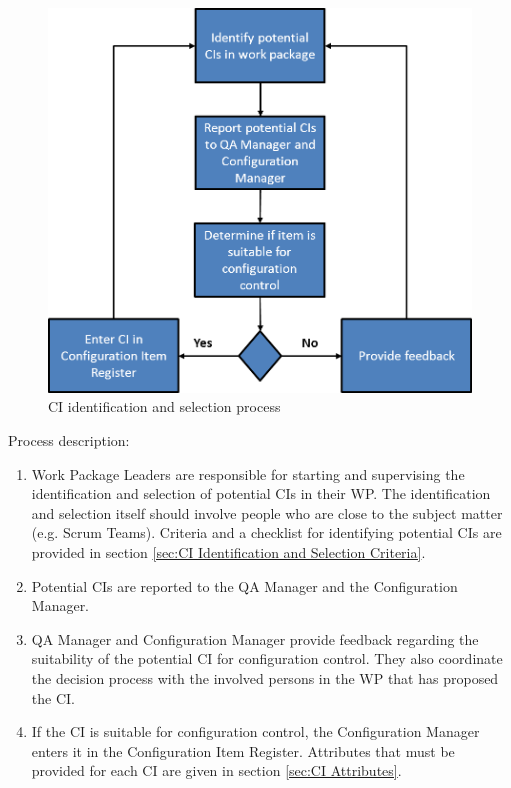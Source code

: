 \documentclass{template/openetcs_article}
\begin{document}
\begin{figure}[H]
\centering
\caption{CI identification and selection process}
\includegraphics[scale=1.0]{./Figure/CI_Process.png}
\end{figure}

Process description:

\vspace{-10pt}
\begin{enumerate}
\item Work Package Leaders are responsible for starting and supervising the identification and selection of potential CIs in their WP. The identification and selection itself should involve people who are close to the subject matter (e.g. Scrum Teams). Criteria and a checklist for identifying potential CIs are provided in section \ref{sec:CI Identification and Selection Criteria}.
\item Potential CIs are reported to the QA Manager and the Configuration Manager.
\item QA Manager and Configuration Manager provide feedback regarding the suitability of the potential CI for configuration control. They also coordinate the decision process with the involved persons in the WP that has proposed the CI.
\item If the CI is suitable for configuration control, the Configuration Manager enters it in the Configuration Item Register. Attributes that must be provided for each CI are given in section \ref{sec:CI Attributes}.
\end{enumerate}
\end{document}

